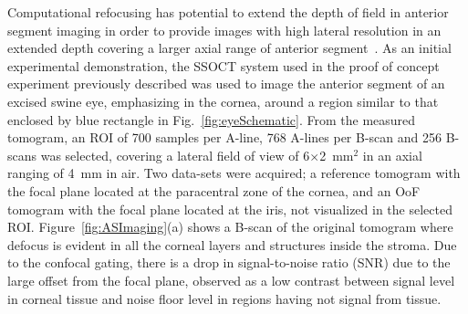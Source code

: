 Computational refocusing has potential to extend the depth of field in anterior segment imaging in order to provide images with high lateral resolution in an extended depth covering a larger axial range of anterior segment~\cite{Wang2019_Cellular}. As an initial experimental demonstration, the SSOCT system used in the proof of concept experiment previously described was used to image the anterior segment of an excised swine eye, emphasizing in the cornea, around a region similar to that enclosed by blue rectangle in Fig.~\ref{fig:eyeSchematic}. From the measured tomogram, an ROI of 700 samples per A-line, 768 A-lines per B-scan and 256 B-scans was selected, covering a lateral field of view of 6$\times$2~mm$^2$ in an axial ranging of 4~mm in air. Two data-sets were acquired; a reference tomogram with the focal plane located at the paracentral zone of the cornea, and an OoF tomogram with the focal plane located at the iris, not visualized in the selected ROI. Figure~\ref{fig:ASImaging}(a) shows a B-scan of the original tomogram where defocus is evident in all the corneal layers and structures inside the stroma. Due to the confocal gating, there is a drop in signal-to-noise ratio (SNR) due to the large offset from the focal plane, observed as a low contrast between signal level in corneal tissue and noise floor level in regions having not signal from tissue.

